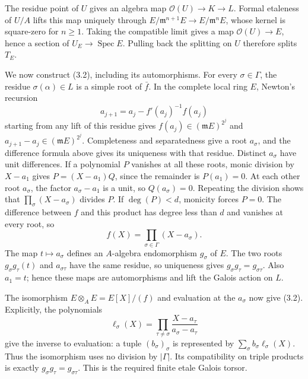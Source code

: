 \documentclass[11pt,a4paper,openany]{report}
\begin{document}
The residue point of \(U\) gives an algebra map \(\mathcal O(U)\to K\to L\). Formal etaleness of \(U/A\) lifts this map uniquely through \(E/\mathfrak m^{n+1}E\to E/\mathfrak m^nE\), whose kernel is square-zero for \(n\geq1\). Taking the compatible limit gives a map \(\mathcal O(U)\to E\), hence a section of \(U_E\to\operatorname{Spec}E\). Pulling back the splitting on \(U\) therefore splits \(T_E\).

We now construct (3.2), including its automorphisms. For every \(\sigma\in\Gamma\), the residue \(\sigma(\alpha)\in L\) is a simple root of \(\bar f\). In the complete local ring \(E\), Newton's recursion \[
a_{j+1}=a_j-f'(a_j)^{-1}f(a_j)
\] starting from any lift of this residue gives \(f(a_j)\in(\mathfrak mE)^{2^j}\) and \(a_{j+1}-a_j\in(\mathfrak mE)^{2^j}\). Completeness and separatedness give a root \(a_\sigma\), and the difference formula above gives its uniqueness with that residue. Distinct \(a_\sigma\) have unit differences. If a polynomial \(P\) vanishes at all these roots, monic division by \(X-a_1\) gives \(P=(X-a_1)Q\), since the remainder is \(P(a_1)=0\). At each other root \(a_\sigma\), the factor \(a_\sigma-a_1\) is a unit, so \(Q(a_\sigma)=0\). Repeating the division shows that \(\prod_\sigma(X-a_\sigma)\) divides \(P\). If \(\deg(P)<d\), monicity forces \(P=0\). The difference between \(f\) and this product has degree less than \(d\) and vanishes at every root, so \[
f(X)=\prod_{\sigma\in\Gamma}(X-a_\sigma).
\] The map \(t\mapsto a_\sigma\) defines an \(A\)-algebra endomorphism \(g_\sigma\) of \(E\). The two roots \(g_\sigma g_\tau(t)\) and \(a_{\sigma\tau}\) have the same residue, so uniqueness gives \(g_\sigma g_\tau=g_{\sigma\tau}\). Also \(a_1=t\); hence these maps are automorphisms and lift the Galois action on \(L\).

The isomorphism \(E\otimes_AE=E[X]/(f)\) and evaluation at the \(a_\sigma\) now give (3.2). Explicitly, the polynomials \[
\ell_\sigma(X)=\prod_{\tau\ne\sigma}
\frac{X-a_\tau}{a_\sigma-a_\tau}
\] give the inverse to evaluation: a tuple \((b_\sigma)_\sigma\) is represented by \(\sum_\sigma b_\sigma\ell_\sigma(X)\). Thus the isomorphism uses no division by \(|\Gamma|\). Its compatibility on triple products is exactly \(g_\sigma g_\tau=g_{\sigma\tau}\). This is the required finite etale Galois torsor.
\end{document}
